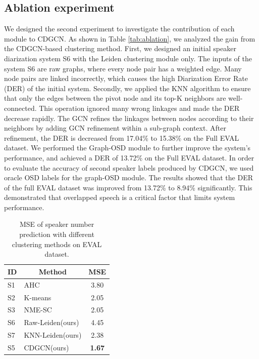 \documentclass[10pt]{article}
\begin{document}
\subsection{Ablation experiment}
We designed the second experiment to investigate the contribution of each module to CDGCN. As shown in Table \ref{tab:ablation}, we analyzed the gain from the CDGCN-based clustering method. First, we designed an initial speaker diarization system S6 with the Leiden clustering module only. The inputs of the system S6 are raw graphs, where every node pair has a weighted edge. Many node pairs are linked incorrectly, which causes the high Diarization Error Rate (DER) of the initial system.
Secondly, we applied the KNN algorithm to ensure that only the edges between the pivot node and its top-K neighbors are well-connected. This operation ignored many wrong linkages and made the DER decrease rapidly. The GCN refines the linkages between nodes according to their neighbors by adding GCN refinement within a sub-graph context. After refinement, the DER is decreased from 17.04\% to 15.38\% on the Full EVAL dataset. We performed the Graph-OSD module to further improve the system's performance, and achieved a DER of 13.72\% on the Full EVAL dataset. In order to evaluate the accuracy of second speaker labels produced by CDGCN, we used oracle OSD labels for the graph-OSD module. The results showed that the DER of the full EVAL dataset was improved from 13.72\% to 8.94\% significantly. This demonstrated that overlapped speech is a critical factor that limits system performance.
\begin{table}[]
\centering
\caption{MSE of speaker number prediction with different clustering methods on EVAL dataset.}
\label{tab:mse}
\begin{tabular}{llc}
\hline
ID & \multicolumn{1}{c}{Method} & MSE           \\ \hline
S1 & AHC                        & 3.80          \\
S2 & K-means                    & 2.05          \\
S3 & NME-SC                     & 2.05          \\
S6 & Raw-Leiden(ours)           & 4.45          \\
S7 & KNN-Leiden(ours)           & 2.38          \\
S5 & CDGCN(ours)                & \textbf{1.67} \\ \hline
\end{tabular}
\vspace{-0.5cm}
\end{table}
\end{document}
